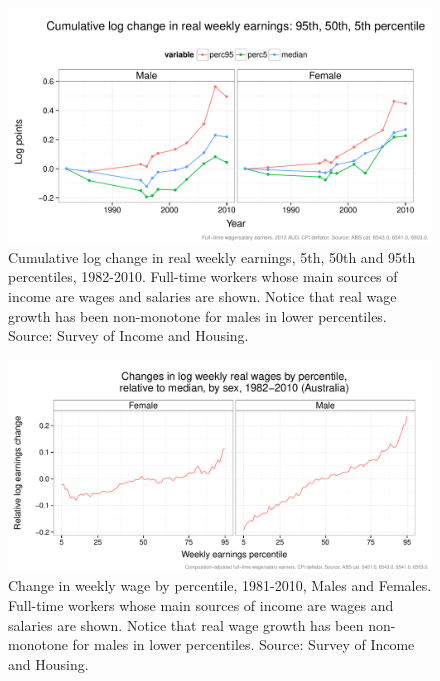 \documentclass[a4paper,11pt]{article}
\begin{document}
\begin{figure}
  \centering
  \includegraphics[width=\textwidth]{../figure/wage_change_time.pdf}
  \caption{Cumulative log change in real weekly earnings, 5th, 50th and 95th percentiles, 1982-2010. Full-time workers whose main sources of income are wages and salaries are shown. Notice that real wage growth has been non-monotone for males in lower percentiles. Source: Survey of Income and Housing.}
  \label{fig:changetime}
\end{figure}

\begin{figure}
  \centering
  \includegraphics[width=\textwidth]{../figure/quantile_mf.pdf}
  \caption{Change in weekly wage by percentile, 1981-2010, Males and Females. Full-time workers whose main sources of income are wages and salaries are shown. Notice that real wage growth has been non-monotone for males in lower percentiles. Source: Survey of Income and Housing.}
  \label{fig:banana}
\end{figure}
\end{document}
